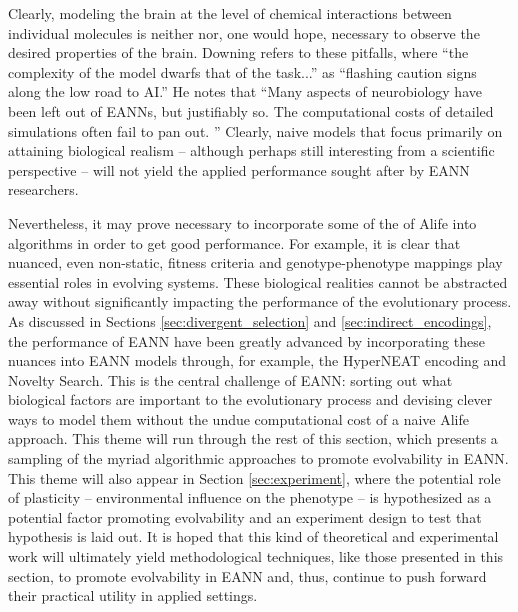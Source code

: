 Clearly, modeling the brain at the level of chemical interactions between individual molecules is neither nor, one would hope, necessary to observe the desired properties of the brain. Downing refers to these pitfalls, where ``the complexity of the model dwarfs that of the task...'' as ``flashing caution signs along the low road to AI.'' He notes that ``Many aspects of neurobiology have been left out of EANNs, but justifiably so. The computational costs of detailed simulations often fail to pan out. '' \cite[pg 354]{Downing2015IntelligenceSystems} Clearly, naive models that focus primarily on attaining biological realism -- although perhaps still interesting from a scientific perspective -- will not yield the applied performance sought after by EANN researchers.

Nevertheless, it may prove necessary to incorporate some of the of Alife into algorithms in order to get good performance. For example, it is clear that nuanced, even non-static, fitness criteria and genotype-phenotype mappings play essential roles in evolving systems. These biological realities cannot be abstracted away without significantly impacting the performance of the evolutionary process. As discussed in Sections \ref{sec:divergent_selection} and \ref{sec:indirect_encodings}, the performance of EANN have been greatly advanced by incorporating these nuances into EANN models through, for example, the HyperNEAT encoding and Novelty Search. This is the central challenge of EANN: sorting out what biological factors are important to the evolutionary process and devising clever ways to model them without the undue computational cost of a naive Alife approach. This theme will run through the rest of this section, which presents a sampling of the myriad algorithmic approaches to promote evolvability in EANN. This theme will also appear in Section \ref{sec:experiment}, where the potential role of plasticity -- environmental influence on the phenotype -- is hypothesized as a potential factor promoting evolvability and an experiment design to test that hypothesis is laid out. It is hoped that this kind of theoretical and experimental work will ultimately yield methodological techniques, like those presented in this section, to promote evolvability in EANN and, thus, continue to push forward their practical utility in applied settings. 


